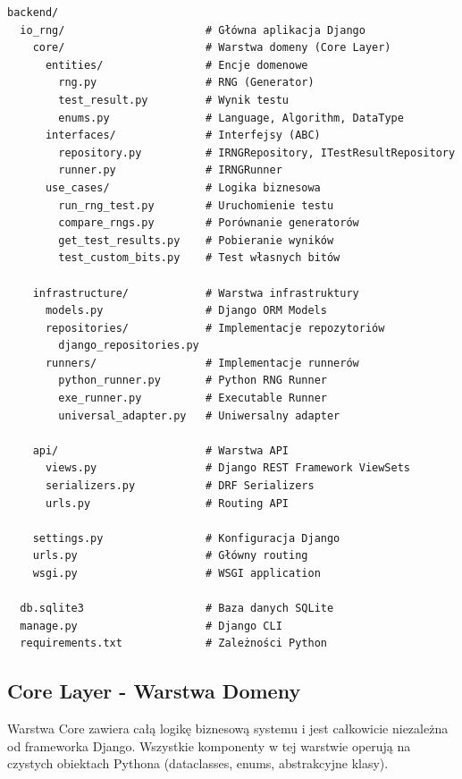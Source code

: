 \documentclass[12pt,a4paper]{article}
\begin{document}
\begin{tcolorbox}[colback=blue!5!white,colframe=blue!75!black,title=Struktura katalogów backendu]
\small
\begin{verbatim}
backend/
  io_rng/                      # Główna aplikacja Django
    core/                      # Warstwa domeny (Core Layer)
      entities/                # Encje domenowe
        rng.py                 # RNG (Generator)
        test_result.py         # Wynik testu
        enums.py               # Language, Algorithm, DataType
      interfaces/              # Interfejsy (ABC)
        repository.py          # IRNGRepository, ITestResultRepository
        runner.py              # IRNGRunner
      use_cases/               # Logika biznesowa
        run_rng_test.py        # Uruchomienie testu
        compare_rngs.py        # Porównanie generatorów
        get_test_results.py    # Pobieranie wyników
        test_custom_bits.py    # Test własnych bitów
    
    infrastructure/            # Warstwa infrastruktury
      models.py                # Django ORM Models
      repositories/            # Implementacje repozytoriów
        django_repositories.py
      runners/                 # Implementacje runnerów
        python_runner.py       # Python RNG Runner
        exe_runner.py          # Executable Runner
        universal_adapter.py   # Uniwersalny adapter
    
    api/                       # Warstwa API
      views.py                 # Django REST Framework ViewSets
      serializers.py           # DRF Serializers
      urls.py                  # Routing API
    
    settings.py                # Konfiguracja Django
    urls.py                    # Główny routing
    wsgi.py                    # WSGI application
  
  db.sqlite3                   # Baza danych SQLite
  manage.py                    # Django CLI
  requirements.txt             # Zależności Python
\end{verbatim}
\end{tcolorbox}

\subsection{Core Layer - Warstwa Domeny}

Warstwa Core zawiera całą logikę biznesową systemu i jest całkowicie niezależna od frameworka Django. Wszystkie komponenty w tej warstwie operują na czystych obiektach Pythona (dataclasses, enums, abstrakcyjne klasy).
\end{document}
